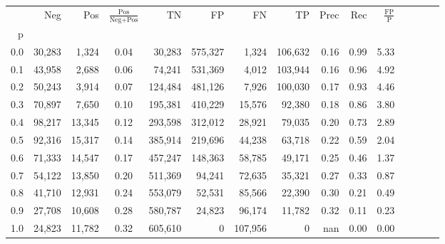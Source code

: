 \begin{tabular}{rrrcrrrrrrrrrrr}
\toprule
{} &     Neg &     Pos & $\frac{\text{Pos}}{\text{Neg}+\text{Pos}}$ &       TN &       FP &       FN &       TP &  Prec &   Rec & $\frac{\text{FP}}{\text{P}}$ \\
p   &         &         &                                            &          &          &          &          &       &       &                              \\
\midrule
0.0 &  30,283 &   1,324 &                                       0.04 &   30,283 &  575,327 &    1,324 &  106,632 &  0.16 &  0.99 &                         5.33 \\
0.1 &  43,958 &   2,688 &                                       0.06 &   74,241 &  531,369 &    4,012 &  103,944 &  0.16 &  0.96 &                         4.92 \\
0.2 &  50,243 &   3,914 &                                       0.07 &  124,484 &  481,126 &    7,926 &  100,030 &  0.17 &  0.93 &                         4.46 \\
0.3 &  70,897 &   7,650 &                                       0.10 &  195,381 &  410,229 &   15,576 &   92,380 &  0.18 &  0.86 &                         3.80 \\
0.4 &  98,217 &  13,345 &                                       0.12 &  293,598 &  312,012 &   28,921 &   79,035 &  0.20 &  0.73 &                         2.89 \\
0.5 &  92,316 &  15,317 &                                       0.14 &  385,914 &  219,696 &   44,238 &   63,718 &  0.22 &  0.59 &                         2.04 \\
0.6 &  71,333 &  14,547 &                                       0.17 &  457,247 &  148,363 &   58,785 &   49,171 &  0.25 &  0.46 &                         1.37 \\
0.7 &  54,122 &  13,850 &                                       0.20 &  511,369 &   94,241 &   72,635 &   35,321 &  0.27 &  0.33 &                         0.87 \\
0.8 &  41,710 &  12,931 &                                       0.24 &  553,079 &   52,531 &   85,566 &   22,390 &  0.30 &  0.21 &                         0.49 \\
0.9 &  27,708 &  10,608 &                                       0.28 &  580,787 &   24,823 &   96,174 &   11,782 &  0.32 &  0.11 &                         0.23 \\
1.0 &  24,823 &  11,782 &                                       0.32 &  605,610 &        0 &  107,956 &        0 &   nan &  0.00 &                         0.00 \\
\bottomrule
\end{tabular}
